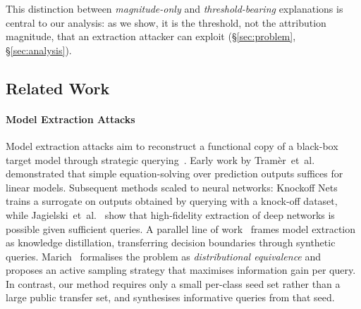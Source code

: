 \documentclass[sigconf,anonymous,review]{acmart}
\begin{document}
This distinction between \emph{magnitude-only} and \emph{threshold-bearing}
explanations is central to our analysis: as we show, it is the threshold, not the
attribution magnitude, that an extraction attacker can exploit
(\S\ref{sec:problem}, \S\ref{sec:analysis}).

\subsection{Related Work}
\label{subsec:related}

\paragraph{Model Extraction Attacks}
Model extraction attacks aim to reconstruct a functional copy of a black-box target model through strategic querying~\cite{tramer2016stealing}.
Early work by Tram\`er~et~al.~\cite{tramer2016stealing} demonstrated that
simple equation-solving over prediction outputs suffices for linear models.
Subsequent methods scaled to neural networks: Knockoff Nets~\cite{orekondy2019knockoff}
trains a surrogate on outputs obtained by querying with a knock-off dataset,
while Jagielski~et~al.~\cite{jagielski2020high} show that high-fidelity extraction
of deep networks is possible given sufficient queries.
A parallel line of work~\cite{papernot2017practical,correia2018copycat} frames
model extraction as knowledge distillation, transferring decision boundaries
through synthetic queries.
Marich~\cite{karmakar2023marich} formalises the problem as \emph{distributional equivalence}
and proposes an active sampling strategy that maximises information gain per query.
In contrast, our method requires only a small per-class seed set rather than a large
public transfer set, and synthesises informative queries from that seed.
\end{document}
